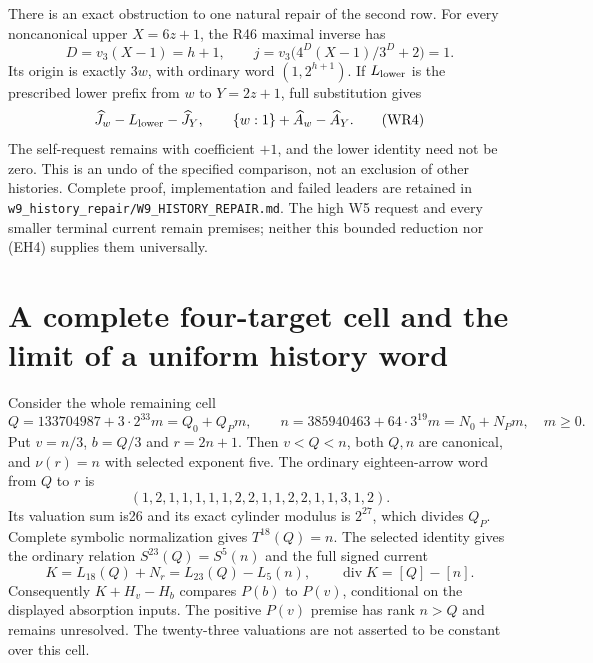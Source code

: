 \documentclass[11pt]{article}
\begin{document}
There is an exact obstruction to one natural repair of the second row.
For every noncanonical upper $X=6z+1$, the R46 maximal inverse has
\[
 D=v_3(X-1)=h+1,\qquad
 j=v_3\bigl(4^D(X-1)/3^D+2\bigr)=1.
 \tag{WR3}
\]
Its origin is exactly $3w$, with ordinary word $(1,2^{h+1})$.
If $L_{\rm lower}$ is the prescribed lower prefix from $w$ to
$Y=2z+1$, full substitution gives
\[
 \widehat J_w-L_{\rm lower}-\widehat J_Y,\qquad
 \{w:1\}+\widehat A_w-\widehat A_Y.
 \tag{WR4}
\]
The self-request remains with coefficient $+1$, and the lower identity
need not be zero. This is an undo of the specified comparison, not an
exclusion of other histories. Complete proof, implementation and failed
leaders are retained in
\texttt{w9\_history\_repair/W9\_HISTORY\_REPAIR.md}.
The high W5 request and every smaller terminal current remain premises;
neither this bounded reduction nor (EH4) supplies them universally.

\section{A complete four-target cell and the limit of a uniform history word}
Consider the whole remaining cell
\[
 Q=133704987+3\cdot2^{33}m=Q_0+Q_Pm,\qquad
 n=385940463+64\cdot3^{19}m=N_0+N_Pm,\quad m\ge0.
\]
Put $v=n/3$, $b=Q/3$ and $r=2n+1$. Then $v<Q<n$, both
$Q,n$ are canonical, and $\nu(r)=n$ with selected exponent five.
The ordinary eighteen-arrow word from $Q$ to $r$ is
\[
 (1,2,1,1,1,1,1,2,2,1,1,2,2,1,1,3,1,2).
\]
Its valuation sum is26 and its exact cylinder modulus is $2^{27}$,
which divides $Q_P$. Complete symbolic normalization gives
$T^{18}(Q)=n$. The selected identity gives the ordinary relation
$S^{23}(Q)=S^5(n)$ and the full signed current
\[
 K=L_{18}(Q)+N_r=L_{23}(Q)-L_5(n),\qquad
 \operatorname{div}K=[Q]-[n].
\]
Consequently $K+H_v-H_b$ compares $P(b)$ to $P(v)$, conditional
on the displayed absorption inputs. The positive $P(v)$ premise has
rank $n>Q$ and remains unresolved. The twenty-three valuations are
not asserted to be constant over this cell.
\end{document}
